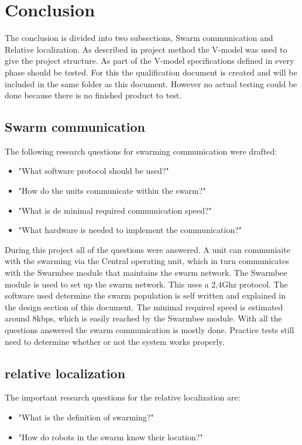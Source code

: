 \documentclass[10pt,a4paper]{article}
\begin{document}
\section{Conclusion}
The conclusion is divided into two subsections, Swarm communication and Relative localization. As described in project method the V-model was used to give the project structure. As part of the V-model specifications defined in every phase should be tested. For this the qualification document is created and will be included in the same folder as this document. However no actual testing could be done because there is no finished product to test.

\subsection{Swarm communication}
The following research questions for swarming communication were drafted:
   
    \begin{itemize}
        \item "What software protocol should be used?"
        \item "How do the units communicate within the swarm?"
        \item "What is de minimal required communication speed?"
        \item "What hardware is needed to implement the communication?"
    \end{itemize}
    
During this project all of the questions were answered. A unit can communiaite with the swarming via the Central operating unit, which in turn communicates with the Swarmbee module that maintains the swarm network. The Swarmbee module is used to set up the swarm network. This uses a 2,4Ghz protocol. The software used determine the swarm population is self written and explained in the design section of this document. The minimal required speed is estimated around 8kbps, which is easily reached by the Swarmbee module. With all the questions answered the swarm communication is mostly done. Practice tests still need to determine whether or not the system works properly.

\subsection{relative localization} 
The important research questions for the relative localization are:

    \begin{itemize}
        \item "What is the definition of swarming?"
        \item "How do robots in the swarm know their location?"
    \end{itemize}
\end{document}
